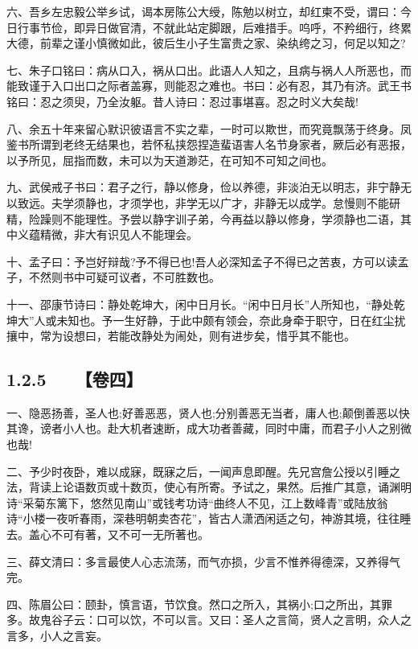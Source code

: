 \documentclass[letterpaper,12pt,english]{sphinxmanual}
\begin{document}
六、吾乡左忠毅公举乡试，谒本房陈公大绶，陈勉以树立，却红柬不受，谓曰：今日行事节俭，即异日做官清，不就此站定脚跟，后难措手。呜呼，不矜细行，终累大德，前辈之谨小慎微如此，彼后生小子生富贵之家、染纨绔之习，何足以知之?

七、朱子口铭曰：病从口入，祸从口出。此语人人知之，且病与祸人人所恶也，而能致谨于入口出口之际者盖寡，则能忍之难也。书曰：必有忍，其乃有济。武王书铭曰：忍之须臾，乃全汝躯。昔人诗曰：忍过事堪喜。忍之时义大矣哉!

八、余五十年来留心默识彼语言不实之辈，一时可以欺世，而究竟飘荡于终身。凤鉴书所谓到老终无结果也，若怀私挟怨捏造蜚语害人名节身家者，厥后必有恶报，以予所见，屈指而数，未可以为天道渺茫，在可知不可知之间也。

九、武侯戒子书曰：君子之行，静以修身，俭以养德，非淡泊无以明志，非宁静无以致远。夫学须静也，才须学也，非学无以广才，非静无以成学。怠慢则不能研精，险躁则不能理性。予尝以静字训子弟，今再益以静以修身，学须静也二语，其中义蕴精微，非大有识见人不能理会。

十、孟子曰：予岂好辩哉?予不得已也!吾人必深知孟子不得已之苦衷，方可以读孟子，不然则书中可疑可议者，不可胜数也。

十一、邵康节诗曰：静处乾坤大，闲中日月长。“闲中日月长”人所知也，“静处乾坤大”人或未知也。予一生好静，于此中颇有领会，奈此身牵于职守，日在红尘扰攘中，常为设想曰，若能改静处为闹处，则有进步矣，惜乎其不能也。


\subsection{1.2.5   【卷四】}
\label{\detokenize{p00_u5176_u5b83/_u300a_u5f20_u82f1-_u806a_u8bad_u658b_u8bed_u300b_u300a_u5f20_u5ef7_u7389-_u6f84_u6000_u56ed_u8bed_u300b_u5408_u8f91:id12}}
一、隐恶扬善，圣人也;好善恶恶，贤人也;分别善恶无当者，庸人也;颠倒善恶以快其谗，谤者小人也。赴大机者速断，成大功者善藏，同时中庸，而君子小人之别微也哉!

二、予少时夜卧，难以成寐，既寐之后，一闻声息即醒。先兄宫詹公授以引睡之法，背读上论语数页或十数页，使心有所寄。予试之，果然。后推广其意，诵渊明诗“采菊东篱下，悠然见南山”或钱考功诗“曲终人不见，江上数峰青”或陆放翁诗“小楼一夜听春雨，深巷明朝卖杏花”，皆古人潇洒闲适之句，神游其境，往往睡去。盖心不可有著，又不可一无所著也。

三、薛文清曰：多言最使人心志流荡，而气亦损，少言不惟养得德深，又养得气完。

四、陈眉公曰：颐卦，慎言语，节饮食。然口之所入，其祸小;口之所出，其罪多。故鬼谷子云：口可以饮，不可以言。又曰：圣人之言简，贤人之言明，众人之言多，小人之言妄。
\end{document}
